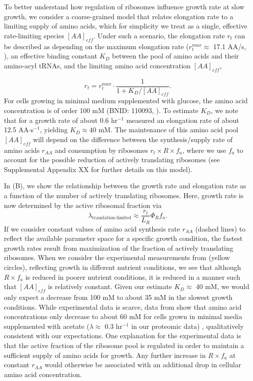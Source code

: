 To better understand how regulation of ribosomes influence growth rate at
slow growth, we consider a coarse-grained model that relates elongation
rate to a limiting supply of amino acids, which for simplicity we treat as a
single, effective rate-limiting species $[AA]_{eff}$. Under such a scenario, the elongation
rate $r_t$ can be described as depending on the maximum elongation rate ($r_t^{max}
\approx$ 17.1 AA/s, \citep{dai2016, dai2018}), an effective binding constant
$K_D$ between the pool of amino acids and their amino-acyl tRNAs, and the limiting
amino acid concentration $[AA]_{eff}$,

\begin{equation}
r_t = r_t^{max} \cdot \frac{1}{1 + K_D / [AA]_{eff}}.
\label{eq:rate_Kd}
\end{equation}
For cells growing in minimal medium supplemented with glucose, the amino acid
concentration is of order 100 mM (BNID: 110093, \citep{milo2010, bennett2009}).
To estimate  $K_D$, we note that for a growth rate of about 0.6 hr$^{-1}$
\cite{dai2016} measured an elongation rate of about 12.5 AA$\cdot$s$^{-1}$,
yielding $K_D \approx 40$ mM. The maintenance of this amino acid pool
$[AA]_{eff}$ will depend on the difference between the synthesis/supply rate of
amino acids $r_{AA}$ and consumption by ribosomes $r_t \times R \times f_a$,
where we use $f_a$ to account for the possible reduction of actively translating
ribosomes (see Supplemental Appendix XX for further details on this model).

In (B), we show the relationship between the growth
rate and elongation rate as a function of the number of actively translating
ribosomes. Here, growth rate is now determined by the active ribosomal fraction via
\begin{equation}
\lambda_\text{translation-limited} \approx \frac{r_t}{L_R}  \Phi_R f_a.
\label{eq:translation_limit_growth_rate_2}
\end{equation}
If we consider constant values of amino acid synthesis rate $r_{AA}$ (dashed
lines) to reflect the available parameter space for a specific growth condition,
the fastest growth rates result from  maximization of the fraction of actively translating
ribosomes. When we consider the experimental measurements from \cite{dai2018}
(yellow circles), reflecting growth in different nutrient conditions, we see
that although $R \times f_a$ is reduced in poorer nutrient conditions, it is
reduced in a manner such that $[AA]_{eff}$ is relatively constant. Given our estimate
$K_D \approx$ 40 mM,  we would only expect a decrease from 100 mM to about 35 mM
in the slowest growth conditions. While experimental data is scarce, data from
\cite{bennett2009} show that amino acid
concentrations only decrease to about 60 mM for cells grown in minimal media
supplemented with acetate ($\lambda \approx$  0.3 hr$^{-1}$ in our proteomic data)
\citep{bennett2009}, qualitatively consistent with our expectations. One
explanation for the experimental data is that the active fraction of the
ribosome pool is regulated in order to maintain a sufficient supply of amino acids for
growth. Any further increase in $R \times f_a$ at constant $r_{AA}$ would
otherwise be associated with an additional drop in cellular amino acid
concentration.

